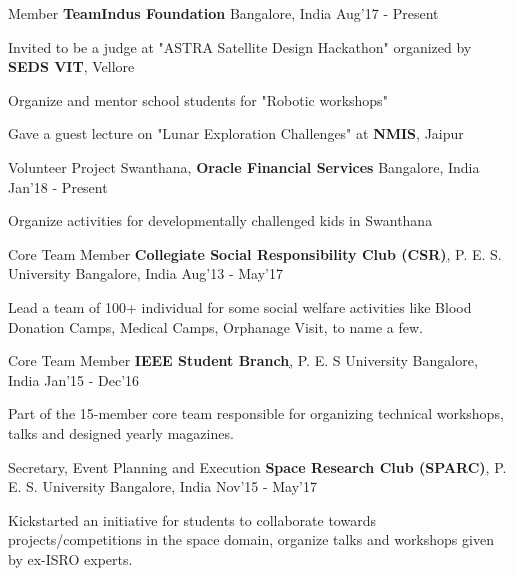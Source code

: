 \begin{cventries}
	\cventry
	{Member}
	{\textbf{TeamIndus Foundation}}
	{Bangalore, India}
	{Aug'17 - Present}
	{
		\begin{cvitems}
		\item{Invited to be a judge at "ASTRA Satellite Design Hackathon" organized by \textbf{SEDS VIT}, Vellore}
		\item{Organize and mentor school students for "Robotic workshops"}
		\item{Gave a guest lecture on "Lunar Exploration Challenges" at \textbf{NMIS}, Jaipur}
		\end{cvitems}
	}

	\cventry
	{Volunteer}
	{Project Swanthana, \textbf{Oracle Financial Services}}
	{Bangalore, India}
	{Jan'18 - Present}
	{
		\begin{cvitems}
		\item{Organize activities for developmentally challenged kids in Swanthana}
		\end{cvitems}
	}

	\cventry
	{Core Team Member}
	{\textbf{Collegiate Social Responsibility Club (CSR)}\href{http://pes.edu/clubs/pes-csr-club/}, P. E. S. University}
	{Bangalore, India}
	{Aug'13 - May'17}
	{
		\begin{cvitems}
		\item{Lead a team of 100+ individual for some social welfare activities like Blood Donation Camps, Medical Camps, Orphanage Visit, to name a few.}
		\end{cvitems}
	}

	\cventry
	{Core Team Member}
	{\textbf{IEEE Student Branch}\href{http://ieee.pes.edu/}, P. E. S University}
	{Bangalore, India}
	{Jan'15 - Dec'16}
	{
		\begin{cvitems}
		\item{Part of the 15-member core team responsible for organizing technical workshops, talks and designed yearly magazines.}
		\end{cvitems}
	}

	\cventry
	{Secretary, Event Planning and Execution}
	{\textbf{Space Research Club (SPARC)}\href{https://www.facebook.com/Space-Research-Club-Of-PES-University-487153011445398/?tn-str=k*F}, P. E. S. University}
	{Bangalore, India}
	{Nov'15 - May'17}
	{
		\begin{cvitems}
		\item{Kickstarted an initiative for students to collaborate towards projects/competitions in the space domain, organize talks and workshops given by ex-ISRO experts.}
		\end{cvitems}
	}


\end{cventries}
